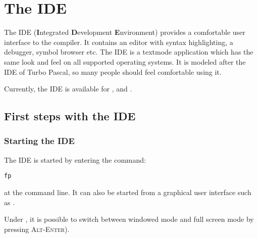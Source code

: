 %
%
%
%
%
\chapter{The IDE}

The IDE (\textbf{I}ntegrated \textbf{D}evelopment \textbf{E}nvironment)
provides a comfortable user interface to the compiler. It contains an 
editor with syntax highlighting, a debugger, symbol browser etc. 
The IDE is a textmode application which has the same look and feel 
on all supported operating systems. It is modeled after the IDE of Turbo
Pascal, so many people should feel comfortable using it.

Currently, the IDE is available for \dos, \windows and \linux.

\section{First steps with the IDE}
%
%
\subsection{Starting the IDE}
The IDE is started by entering the command:
\begin{verbatim}
fp
\end{verbatim}
at the command line. It can also be started from a graphical user 
interface such as \windows. 
\begin{remark}
Under \windows, it is possible to switch between windowed mode and 
full screen mode by pressing \textsc{Alt-Enter}).
\end{remark}
%
%
